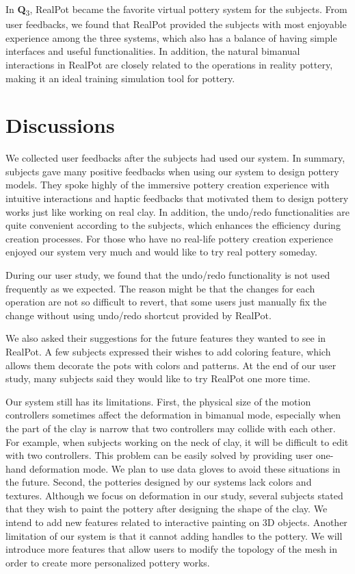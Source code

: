 \documentclass{svjour3}                     %
\begin{document}
In \textbf{Q}\textsubscript{3}, RealPot became the favorite virtual pottery system for the subjects. From user feedbacks, we found that RealPot provided the subjects with most enjoyable experience among the three systems, which also has a balance of having simple interfaces and useful functionalities. In addition, the natural bimanual interactions in RealPot are closely related to the operations in reality pottery, making it an ideal training simulation tool for pottery.

\section{Discussions}
\label{sec:7}
We collected user feedbacks after the subjects had used our system. In summary, subjects gave many positive feedbacks when using our system to design pottery models. They spoke highly of the immersive pottery creation experience with intuitive interactions and haptic feedbacks that motivated them to design pottery works just like working on real clay. In addition, the undo/redo functionalities are quite convenient according to the subjects, which enhances the efficiency during creation processes. For those who have no real-life pottery creation experience enjoyed our system very much and would like to try real pottery someday. 

During our user study, we found that the undo/redo functionality is not used frequently as we expected.
The reason might be that the changes for each operation are not so difficult to revert, that some users just manually fix the change without using undo/redo shortcut provided by RealPot.

We also asked their suggestions for the future features they wanted to see in RealPot.
A few subjects expressed their wishes to add coloring feature, which allows them decorate the pots with colors and patterns.
At the end of our user study, many subjects said they would like to try RealPot one more time.

Our system still has its limitations. First, the physical size of the motion controllers sometimes affect the deformation in bimanual mode, especially when the part of the clay is narrow that two controllers may collide with each other. For example, when subjects working on the neck of clay, it will be difficult to edit with two controllers. This problem can be easily solved by providing user one-hand deformation mode. We plan to use data gloves to avoid these situations in the future.
%
Second, the potteries designed by our systems lack colors and textures. Although we focus on deformation in our study, several subjects stated that they wish to paint the pottery after designing the shape of the clay. We intend to add new features related to interactive painting on 3D objects.
%
Another limitation of our system is that it cannot adding handles to the pottery. We will introduce more features that allow users to modify the topology of the mesh in order to create more personalized pottery works.
\end{document}

